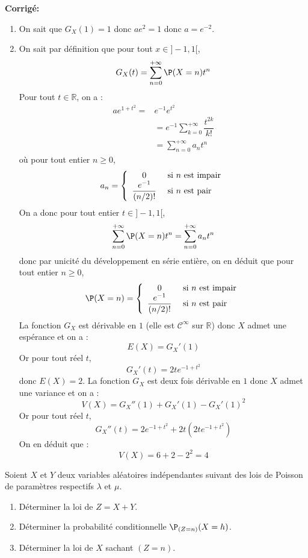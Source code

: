 \documentclass[a4paper,twoside,french,11pt]{VcCours}
\newcommand{\corr}{\textbf{Corrigé:}}
\begin{document}
\corr 

\begin{enumerate}
\item On sait que $G_X(1)=1$ donc $ae^2=1$ donc $a= e^{-2}$.
\item On sait par définition que pour tout $x \in ]-1,1[$,
$$ G_X(t) = \sum_{n=0}^{+ \infty}  \P(X=n) t^n $$
Pour tout $t \in \mathbb{R}$, on a :
\begin{align*}
ae^{1+t^2} = & e^{-1} e^{t^2} \\
& = e^{-1} \sum_{k=0}^{+ \infty} \dfrac{t^{2k}}{k!} \\
& = \sum_{n=0}^{+ \infty} a_n t^n
\end{align*}
où pour tout entier $n \geq 0$,
$$ a_n = \left\lbrace \begin{array}{cl}
0 & \hbox{ si } n \hbox{ est impair} \\
\dfrac{e^{-1}}{(n/2)!} & \hbox{ si } n \hbox{ est pair} \\
\end{array}\right.$$
On a donc pour tout entier $t \in ]-1,1[$,
$$ \sum_{n=0}^{+ \infty}  \P(X=n) t^n= \sum_{n=0}^{+ \infty} a_n t^n $$
donc par unicité du développement en série entière, on en déduit que pour tout entier $n \geq 0$,
$$  \P(X=n) = \left\lbrace \begin{array}{cl}
0 & \hbox{ si } n \hbox{ est impair} \\
\dfrac{e^{-1}}{(n/2)!} & \hbox{ si } n \hbox{ est pair} \\
\end{array}\right.$$
La fonction $G_X$ est dérivable en $1$ (elle est $\mathcal{C}^{\infty}$ sur $\mathbb{R}$) donc $X$ admet une espérance et on a :
$$ E(X)= G_X'(1)$$
Or pour tout réel $t$,
$$ G_X'(t) = 2t e^{-1+t^2}$$
donc $E(X)= 2$. La fonction $G_X$ est deux fois dérivable en $1$ donc $X$ admet une variance et on a :
$$ V(X) = G_X''(1)+G_X'(1)-G_X'(1)^2$$
Or pour tout réel $t$,
$$ G_X''(t) = 2e^{-1+t^2} + 2t (2t e^{-1+t^2})$$
On en déduit que :
$$ V(X) = 6+ 2-2^2=4$$
\end{enumerate}


\begin{Exercice}{}
Soient $X$ et $Y$ deux variables aléatoires indépendantes suivant des lois de Poisson de paramètres respectifs $\lambda$ et $\mu$.
\begin{enumerate}
\item Déterminer la loi de $Z=X+Y$.
\item Déterminer la probabilité conditionnelle $\P_{(Z=n)}(X=h)$.
\item Déterminer la loi de $X$ sachant $(Z=n)$.
\end{enumerate}
\end{Exercice}
\end{document}
